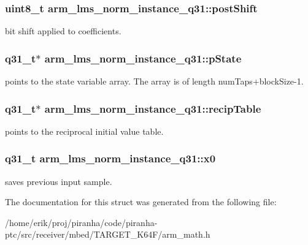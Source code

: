 \subsubsection[{\texorpdfstring{post\+Shift}{postShift}}]{\setlength{\rightskip}{0pt plus 5cm}uint8\+\_\+t arm\+\_\+lms\+\_\+norm\+\_\+instance\+\_\+q31\+::post\+Shift}\hypertarget{structarm__lms__norm__instance__q31_a28d7b9e437817f83397e081967e90f3c}{}\label{structarm__lms__norm__instance__q31_a28d7b9e437817f83397e081967e90f3c}
bit shift applied to coefficients. 
\subsubsection[{\texorpdfstring{p\+State}{pState}}]{\setlength{\rightskip}{0pt plus 5cm}q31\+\_\+t$\ast$ arm\+\_\+lms\+\_\+norm\+\_\+instance\+\_\+q31\+::p\+State}\hypertarget{structarm__lms__norm__instance__q31_a6b25c96cf048b77078d62f4252a01ec4}{}\label{structarm__lms__norm__instance__q31_a6b25c96cf048b77078d62f4252a01ec4}
points to the state variable array. The array is of length num\+Taps+block\+Size-\/1. 
\subsubsection[{\texorpdfstring{recip\+Table}{recipTable}}]{\setlength{\rightskip}{0pt plus 5cm}q31\+\_\+t$\ast$ arm\+\_\+lms\+\_\+norm\+\_\+instance\+\_\+q31\+::recip\+Table}\hypertarget{structarm__lms__norm__instance__q31_a85836d0907077b9ac660f7bbbaa9d694}{}\label{structarm__lms__norm__instance__q31_a85836d0907077b9ac660f7bbbaa9d694}
points to the reciprocal initial value table. 
\subsubsection[{\texorpdfstring{x0}{x0}}]{\setlength{\rightskip}{0pt plus 5cm}q31\+\_\+t arm\+\_\+lms\+\_\+norm\+\_\+instance\+\_\+q31\+::x0}\hypertarget{structarm__lms__norm__instance__q31_a47c4466d644e0d8ba407995adfa9b917}{}\label{structarm__lms__norm__instance__q31_a47c4466d644e0d8ba407995adfa9b917}
saves previous input sample. 

The documentation for this struct was generated from the following file\+:\begin{DoxyCompactItemize}
\item 
/home/erik/proj/piranha/code/piranha-\/ptc/src/receiver/mbed/\+T\+A\+R\+G\+E\+T\+\_\+\+K64\+F/arm\+\_\+math.\+h\end{DoxyCompactItemize}
